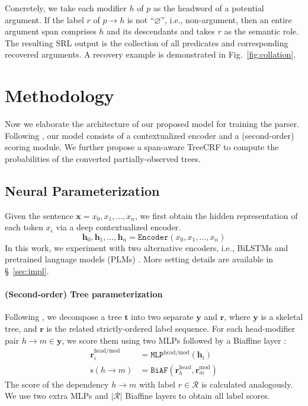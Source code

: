 \documentclass[11pt]{article}
\begin{document}
Concretely, we take each modifier $h$ of $p$ as the headword of a potential argument.
If the label $r$ of $p \rightarrow h$ is not ``$\varnothing$'', i.e., non-argument, then an entire argument span comprises $h$ and its descendants and takes $r$ as the semantic role.
The resulting SRL output is the collection of all predicates and corresponding recovered arguments.
A recovery example is demonstrated in Fig.~\ref{fig:collation}.


\section{Methodology}\label{sec:methodology}

Now we elaborate the architecture of our proposed model for training the parser.
Following \citet{dozat-etal-2017-biaffine,zhang-etal-2020-efficient}, our model consists of a contextualized encoder and a (second-order) scoring module.
We further propose a span-aware TreeCRF to compute the probabilities of the converted partially-observed trees.

\subsection{Neural Parameterization}
Given the sentence $\boldsymbol{x}=x_0,x_1,\dots,x_n$, we first obtain the hidden representation of each token $x_i$ via a deep contextualized encoder.
\begin{equation}
    \mathbf{h}_0,\mathbf{h}_1,\dots,\mathbf{h}_n=\mathtt{Encoder}(x_0,x_1,\dots,x_n)
\end{equation}
In this work, we experiment with two alternative encoders, i.e., BiLSTMs \cite{yarin-etal-2016-dropout} and pretrained language models (PLMs) \cite{devlin-etal-2019-bert}.
More setting details are available in \S~\ref{sec:impl}.


\paragraph{(Second-order) Tree parameterization}
Following \citet{dozat-etal-2017-biaffine}, we decompose a tree $\boldsymbol{t}$ into two separate $\boldsymbol{y}$ and $\boldsymbol{r}$, where $\boldsymbol{y}$ is a skeletal tree, and $\boldsymbol{r}$ is the related strictly-ordered label sequence.
For each head-modifier pair $h\rightarrow m \in \boldsymbol{y}$, we score them using two MLPs followed by a Biaffine layer \cite{cai-etal-2018-full}:
\begin{equation}
    \begin{aligned}
        \mathbf{r}^{\mathrm{head}/\mathrm{mod}}_i & = \mathtt{MLP}^{\mathrm{head}/\mathrm{mod}}(\mathbf{h}_i)                                \\
        \mathrm{s}(h\rightarrow m)                & = \mathtt{BiAF}\left(\mathbf{r}^{\mathrm{head}}_{h},\mathbf{r}^{\mathrm{mod}}_{m}\right)
    \end{aligned}
\end{equation}
The score of the dependency $h\rightarrow m$ with label $r\in \mathcal{R}$ is calculated analogously.
We use two extra MLPs and $|\mathcal{R}|$ Biaffine layers to obtain all label scores.
\end{document}
